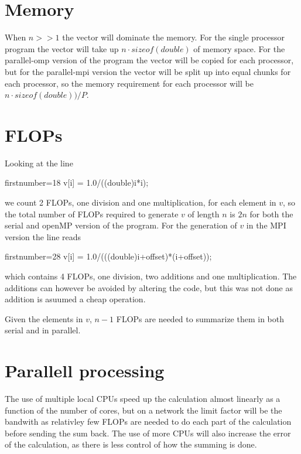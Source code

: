 \documentclass[11pt,a4paper,english]{article}
\begin{document}
\section{Memory}
When $n>>1$ the vector will dominate the memory. For the single processor
program the vector will take up $n \cdot sizeof(double)$ of memory space. For
the parallel-omp version of the program the vector will be copied for each
processor, but for the parallel-mpi version the vector will be split up into
equal chunks for each processor, so the memory requirement for each processor
will be $n \cdot sizeof(double))/P$.

\section{FLOPs}
Looking at the line
\begin{ccode*}{firstnumber=18}
v[i] = 1.0/((double)i*i);
\end{ccode*}
we count 2 FLOPs, one division and one multiplication, for each element in $v$,
so the total number of FLOPs required to generate $v$ of length $n$ is $2n$ for
both the serial and openMP version of the program. For the generation of $v$ in
the MPI version the line reads
\begin{ccode*}{firstnumber=28}
v[i] = 1.0/(((double)i+offset)*(i+offset));
\end{ccode*}
which contains 4 FLOPs, one division, two additions and one multiplication. The
additions can however be avoided by altering the code, but this was not done as
addition is asuumed a cheap operation.

Given the elements in $v$, $n-1$ FLOPs are needed to summarize them in
both serial and in parallel.

\section{Parallell processing}
The use of multiple local CPUs speed up the calculation almost linearly as a
function of the number of cores, but on a network the limit factor will be the
bandwith as relativley few FLOPs are needed to do each part of the calculation
before sending the sum back. The use of more CPUs will also increase the error
of the calculation, as there is less control of how the summing is done.  
\end{document}
